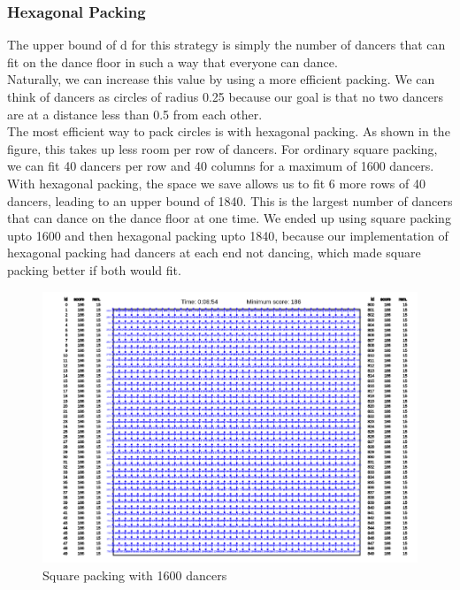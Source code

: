 \subsubsection{Hexagonal Packing}
The upper bound of d for this strategy is simply the number of dancers that can fit on the dance floor in such a way that everyone can dance.\\
Naturally, we can increase this value by using a more efficient packing. We can think of dancers as circles of radius 0.25 because our goal is that no two dancers are at a distance less than 0.5 from each other.\\
The most efficient way to pack circles is with hexagonal packing. As shown in the figure, this takes up less room per row of dancers. For ordinary square packing, we can fit 40 dancers per row and 40 columns for a maximum of 1600 dancers. With hexagonal packing, the space we save allows us to fit 6 more rows of 40 dancers, leading to an upper bound of 1840. This is the largest number of dancers that can dance on the dance floor at one time. We ended up using square packing upto 1600 and then hexagonal packing upto 1840, because our implementation of hexagonal packing had dancers at each end not dancing, which made square packing better if both would fit.\\
\begin{figure}[h]
\center
\includegraphics[scale=0.5]{squarepack.png}
\caption{Square packing with 1600 dancers}
\label{fig:Square Packing}
\end{figure}
\\
